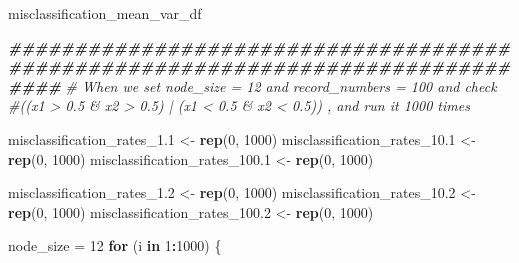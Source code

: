 \documentclass[
]{article}
\newenvironment{Shaded}{\begin{snugshade}}{\end{snugshade}}
\newcommand{\CommentTok}[1]{\textcolor[rgb]{0.56,0.35,0.01}{\textit{#1}}}
\newcommand{\ControlFlowTok}[1]{\textcolor[rgb]{0.13,0.29,0.53}{\textbf{#1}}}
\newcommand{\DecValTok}[1]{\textcolor[rgb]{0.00,0.00,0.81}{#1}}
\newcommand{\DocumentationTok}[1]{\textcolor[rgb]{0.56,0.35,0.01}{\textbf{\textit{#1}}}}
\newcommand{\FloatTok}[1]{\textcolor[rgb]{0.00,0.00,0.81}{#1}}
\newcommand{\FunctionTok}[1]{\textcolor[rgb]{0.13,0.29,0.53}{\textbf{#1}}}
\newcommand{\NormalTok}[1]{#1}
\newcommand{\OtherTok}[1]{\textcolor[rgb]{0.56,0.35,0.01}{#1}}
\newcommand{\SpecialCharTok}[1]{\textcolor[rgb]{0.81,0.36,0.00}{\textbf{#1}}}
\begin{document}
\begin{Shaded}
\begin{Highlighting}[]
\NormalTok{misclassification\_mean\_var\_df}

\DocumentationTok{\#\#\#\#\#\#\#\#\#\#\#\#\#\#\#\#\#\#\#\#\#\#\#\#\#\#\#\#\#\#\#\#\#\#\#\#\#\#\#\#\#\#\#\#\#\#\#\#\#\#\#\#\#\#\#\#\#\#\#\#\#\#\#\#\#\#\#\#\#\#\#\#\#\#\#\#\#\#\#\#}
\CommentTok{\# When we set node\_size = 12 and record\_numbers = 100 and check }
\CommentTok{\#((x1 \textgreater{} 0.5 \& x2 \textgreater{} 0.5) | (x1 \textless{} 0.5 \& x2 \textless{} 0.5)) , and run  it 1000 times}

\NormalTok{misclassification\_rates\_1}\FloatTok{.1} \OtherTok{\textless{}{-}} \FunctionTok{rep}\NormalTok{(}\DecValTok{0}\NormalTok{, }\DecValTok{1000}\NormalTok{)}
\NormalTok{misclassification\_rates\_10}\FloatTok{.1} \OtherTok{\textless{}{-}} \FunctionTok{rep}\NormalTok{(}\DecValTok{0}\NormalTok{, }\DecValTok{1000}\NormalTok{)}
\NormalTok{misclassification\_rates\_100}\FloatTok{.1} \OtherTok{\textless{}{-}} \FunctionTok{rep}\NormalTok{(}\DecValTok{0}\NormalTok{, }\DecValTok{1000}\NormalTok{)}

\NormalTok{misclassification\_rates\_1}\FloatTok{.2} \OtherTok{\textless{}{-}} \FunctionTok{rep}\NormalTok{(}\DecValTok{0}\NormalTok{, }\DecValTok{1000}\NormalTok{)}
\NormalTok{misclassification\_rates\_10}\FloatTok{.2} \OtherTok{\textless{}{-}} \FunctionTok{rep}\NormalTok{(}\DecValTok{0}\NormalTok{, }\DecValTok{1000}\NormalTok{)}
\NormalTok{misclassification\_rates\_100}\FloatTok{.2} \OtherTok{\textless{}{-}} \FunctionTok{rep}\NormalTok{(}\DecValTok{0}\NormalTok{, }\DecValTok{1000}\NormalTok{)}

\NormalTok{node\_size }\OtherTok{=} \DecValTok{12}
\ControlFlowTok{for}\NormalTok{ (i }\ControlFlowTok{in} \DecValTok{1}\SpecialCharTok{:}\DecValTok{1000}\NormalTok{) \{}


\end{Highlighting}
\end{Shaded}
\end{document}
